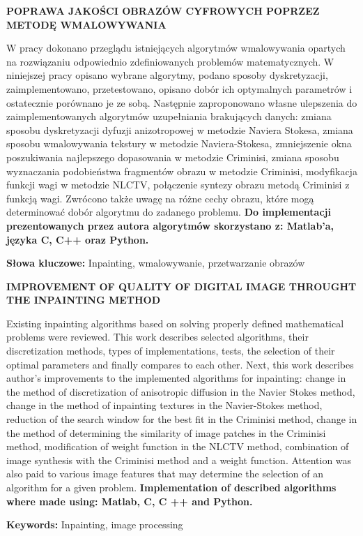 \newpage
\begin{center}
\large \bf
POPRAWA JAKOŚCI OBRAZÓW CYFROWYCH POPRZEZ METODĘ WMALOWYWANIA
\end{center}

W pracy dokonano przeglądu istniejących algorytmów wmalowywania opartych na rozwiązaniu odpowiednio zdefiniowanych problemów matematycznych. W niniejszej pracy opisano wybrane algorytmy, podano sposoby dyskretyzacji, zaimplementowano, przetestowano, opisano dobór ich optymalnych parametrów i ostatecznie porównano je ze sobą. Następnie zaproponowano własne ulepszenia do zaimplementowanych algorytmów uzupełniania brakujących danych: zmiana sposobu dyskretyzacji dyfuzji anizotropowej w metodzie Naviera Stokesa, zmiana sposobu wmalowywania tekstury w metodzie Naviera-Stokesa, zmniejszenie okna poszukiwania najlepszego dopasowania w metodzie Criminisi, zmiana sposobu wyznaczania podobieństwa fragmentów obrazu w metodzie Criminisi,  modyfikacja funkcji wagi w metodzie NLCTV, połączenie syntezy obrazu metodą Criminisi z funkcją wagi. Zwrócono także uwagę na różne cechy obrazu, które mogą determinować dobór algorytmu do zadanego problemu. \textbf{Do implementacji prezentowanych przez autora algorytmów skorzystano z: Matlab'a, języka C, C++ oraz Python.}

\bigskip
{\noindent \bf Słowa kluczowe:} Inpainting, wmalowywanie, przetwarzanie obrazów

\vskip 1cm

\begin{center}
\large \bf
IMPROVEMENT OF QUALITY OF DIGITAL IMAGE THROUGHT THE INPAINTING METHOD
\end{center}

Existing inpainting algorithms based on solving properly defined mathematical problems were reviewed. This work describes selected algorithms, their discretization methods, types of implementations, tests, the selection of their optimal parameters and finally compares to each other.
Next, this work describes author's improvements to the implemented algorithms for inpainting: change in the method of discretization of anisotropic diffusion in the Navier Stokes method, change in the method of inpainting textures in the Navier-Stokes method, reduction of the search window for the best fit in the Criminisi method, change in the method of determining the similarity of image patches in the Criminisi method, modification of weight function in the NLCTV method, combination of image synthesis with the Criminisi method and a weight function.
Attention was also paid to various image features that may determine the selection of an algorithm for a given problem. \textbf {Implementation of described algorithms where made using: Matlab, C, C ++ and Python.}

\bigskip
{\noindent \bf Keywords:} Inpainting, image processing

\vfill